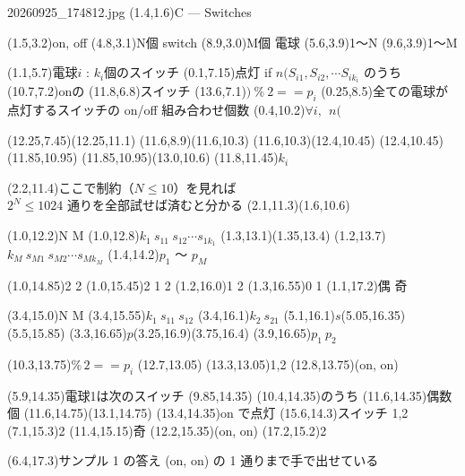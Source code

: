 \documentclass[a4paper]{article}
\begin{document}
\begin{memopage}{20260925\_174812.jpg}
  \hw(1.4,1.6){\LARGE C --- Switches}

  \hw(1.5,3.2){\LARGE on, off}
  \hw(4.8,3.1){\LARGE N個 switch}
  \hw(8.9,3.0){\LARGE M個 電球}
  \hw(5.6,3.9){1〜N}
  \hw(9.6,3.9){1〜M}

  \hw(1.1,5.7){\LARGE 電球$i$ : $k_i$個のスイッチ}
  \hw(0.1,7.15){\huge 点灯 if $n(S_{i1}, S_{i2}, \cdots S_{ik_i}$ のうち}
  \hw(10.7,7.2){\LARGE onの}
  \hw(11.8,6.8){\large スイッチ}
  \hw(13.6,7.1){\LARGE $)\ \%\ 2 == p_i$}
  \hw(0.25,8.5){\LARGE 全ての電球が点灯するスイッチの on/off 組み合わせ個数}
  \hw(0.4,10.2){\LARGE $\forall i,\ \ n($}

  \hwline(12.25,7.45)(12.25,11.1)
  \hwline(11.6,8.9)(11.6,10.3)
  \hwline(11.6,10.3)(12.4,10.45)
  \hwline(12.4,10.45)(11.85,10.95)
  \hwline(11.85,10.95)(13.0,10.6)
  \hw(11.8,11.45){$k_i$}

  \redpen(2.2,11.4){ここで制約（$N \leq 10$）を見れば\\$2^N \leq 1024$ 通りを全部試せば済むと分かる}
  \redarrow(2.1,11.3)(1.6,10.6)

  \hw(1.0,12.2){N M}
  \hw(1.0,12.8){$k_1\ s_{11}\ s_{12} \cdots s_{1k_1}$}
  \hwline(1.3,13.1)(1.35,13.4)
  \hw(1.2,13.7){$k_M\ s_{M1}\ s_{M2} \cdots s_{Mk_M}$}
  \hw(1.4,14.2){$p_1$ 〜 $p_M$}

  \hw(1.0,14.85){2 2}
  \hw(1.0,15.45){2 1 {\normalsize 2}}
  \hw(1.2,16.0){1 2}
  \hw(1.3,16.55){0 1}
  \hw(1.1,17.2){偶 奇}

  \hw(3.4,15.0){N M}
  \hw(3.4,15.55){$k_1\ s_{11}\ s_{12}$}
  \hw(3.4,16.1){$k_2\ s_{21}$}
  \hw(5.1,16.1){$s$}\hwline(5.05,16.35)(5.5,15.85)
  \hw(3.3,16.65){$p$}\hwline(3.25,16.9)(3.75,16.4)
  \hw(3.9,16.65){$p_1\ p_2$}

  \hw(10.3,13.75){$\%\,2 == p_i$}
  \hwunreadmark(12.7,13.05)
  \hw(13.3,13.05){1,2}
  \hw(12.8,13.75){(on, on)}

  \hw(5.9,14.35){\large 電球1は次のスイッチ}
  \hwunreadmark(9.85,14.35)
  \hw(10.4,14.35){\large のうち}
  \hw(11.6,14.35){\large 偶数個}
  \hwline(11.6,14.75)(13.1,14.75)
  \hw(13.4,14.35){\large on で点灯}
  \hw(15.6,14.3){\large スイッチ 1,2}
  \hw(7.1,15.3){2}
  \hw(11.4,15.15){奇}
  \hw(12.2,15.35){(on, on)}
  \hw(17.2,15.2){2}

  \redpen(6.4,17.3){サンプル 1 の答え (on, on) の 1 通りまで手で出せている}


\end{memopage}
\end{document}
